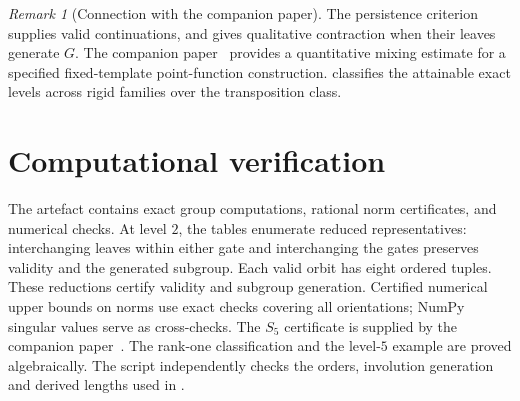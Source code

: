 \documentclass[11pt]{amsart}
\theoremstyle{definition}
\theoremstyle{remark}
\newtheorem{remark}[remark]{Remark}
\theoremstyle{plain}
\theoremstyle{plain}
\numberwithin{equation}{section}
\begin{document}
\begin{remark}[Connection with the companion paper]
\label{rem:p0scope}
The persistence criterion supplies valid continuations, and
 gives qualitative contraction when their leaves
generate $G$. The companion paper~\cite{ZermenoS5} provides a quantitative
mixing estimate for a specified fixed-template point-function construction.
 classifies the attainable exact levels across rigid
families over the transposition class.
\end{remark}

\newpage


\newpage


\newpage


\newpage
\section{Computational verification}
\label{sec:computation}

The artefact contains exact group computations, rational norm certificates,
and numerical checks. At level $2$, the tables enumerate reduced representatives:
interchanging leaves within either gate and interchanging the gates preserves
validity and the generated subgroup. Each valid orbit has eight ordered tuples.
These reductions certify validity and subgroup generation. Certified
numerical upper bounds on norms use exact checks covering all orientations;
NumPy singular values serve as cross-checks. The $S_5$ certificate is supplied
by the companion paper~\cite{ZermenoS5}.
The rank-one classification and the level-$5$ example are proved
algebraically. The script  independently
checks the orders, involution generation and derived lengths used in
.
\end{document}
